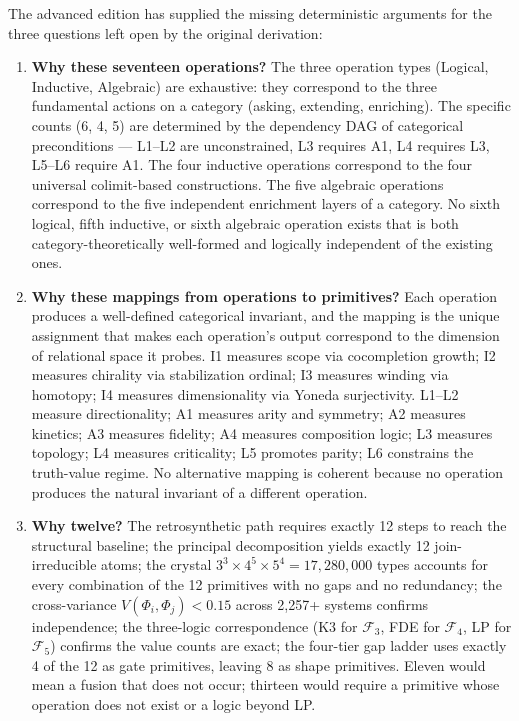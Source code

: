 \documentclass[12pt,a4paper]{article}
\begin{document}
The advanced edition has supplied the missing deterministic arguments for the three questions left open by the original derivation:
\begin{enumerate}
\item \textbf{Why these seventeen operations?} The three operation types (Logical, Inductive, Algebraic) are exhaustive: they correspond to the three fundamental actions on a category (asking, extending, enriching). The specific counts (6, 4, 5) are determined by the dependency DAG of categorical preconditions --- L1--L2 are unconstrained, L3 requires A1, L4 requires L3, L5--L6 require A1. The four inductive operations correspond to the four universal colimit-based constructions. The five algebraic operations correspond to the five independent enrichment layers of a category. No sixth logical, fifth inductive, or sixth algebraic operation exists that is both category-theoretically well-formed and logically independent of the existing ones.
\item \textbf{Why these mappings from operations to primitives?} Each operation produces a well-defined categorical invariant, and the mapping is the unique assignment that makes each operation's output correspond to the dimension of relational space it probes. I1 measures scope via cocompletion growth; I2 measures chirality via stabilization ordinal; I3 measures winding via homotopy; I4 measures dimensionality via Yoneda surjectivity. L1--L2 measure directionality; A1 measures arity and symmetry; A2 measures kinetics; A3 measures fidelity; A4 measures composition logic; L3 measures topology; L4 measures criticality; L5 promotes parity; L6 constrains the truth-value regime. No alternative mapping is coherent because no operation produces the natural invariant of a different operation.
\item \textbf{Why twelve?} The retrosynthetic path requires exactly 12 steps to reach the structural baseline; the principal decomposition yields exactly 12 join-irreducible atoms; the crystal $3^3 \times 4^5 \times 5^4 = 17{,}280{,}000$ types accounts for every combination of the 12 primitives with no gaps and no redundancy; the cross-variance $V(Φ_i,Φ_j) < 0.15$ across 2,257+ systems confirms independence; the three-logic correspondence (K3 for $\mathcal{F}_3$, FDE for $\mathcal{F}_4$, LP for $\mathcal{F}_5$) confirms the value counts are exact; the four-tier gap ladder uses exactly 4 of the 12 as gate primitives, leaving 8 as shape primitives. Eleven would mean a fusion that does not occur; thirteen would require a primitive whose operation does not exist or a logic beyond LP.
\end{enumerate}
\end{document}
